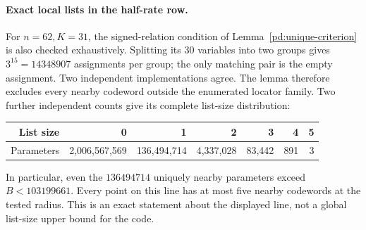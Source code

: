 \paragraph{Exact local lists in the half-rate row.}
For $n=62,K=31$, the signed-relation condition of
Lemma~\ref{pd:unique-criterion} is also checked exhaustively. Splitting
its $30$ variables into two groups gives $3^{15}=14348907$ assignments
per group; the only matching pair is the empty assignment. Two
independent implementations agree. The lemma therefore excludes every
nearby codeword outside the enumerated locator family. Two further
independent counts give its complete list-size distribution:
\begin{center}
\begin{tabular}{@{}rrrrrrr@{}}
\toprule
List size&0&1&2&3&4&5\\
\midrule
Parameters&2,006,567,569&136,494,714&4,337,028&83,442&891&3\\
\bottomrule
\end{tabular}
\end{center}
In particular, even the $136494714$ uniquely nearby parameters exceed
$B<103199661$. Every point on this line has at most five nearby
codewords at the tested radius. This is an exact statement about the
displayed line, not a global list-size upper bound for the code.
